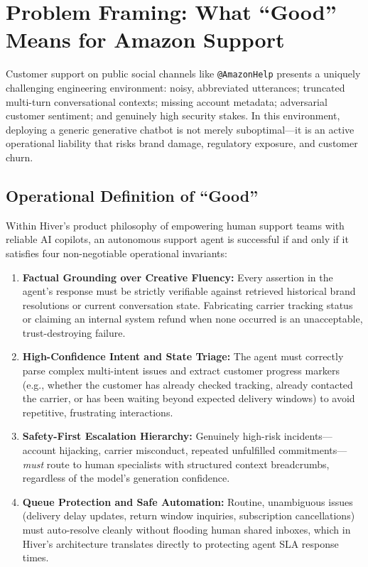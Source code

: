 \documentclass[10pt,twocolumn,a4paper]{article}
\begin{document}
\section{Problem Framing: What ``Good'' Means for Amazon Support}
\label{sec:problem}

Customer support on public social channels like \texttt{@AmazonHelp}
presents a uniquely challenging engineering environment: noisy,
abbreviated utterances; truncated multi-turn conversational contexts;
missing account metadata; adversarial customer sentiment; and genuinely
high security stakes. In this environment, deploying a generic
generative chatbot is not merely suboptimal---it is an active
operational liability that risks brand damage, regulatory exposure,
and customer churn.

\subsection{Operational Definition of ``Good''}
Within Hiver's product philosophy of empowering human support teams
with reliable AI copilots, an autonomous support agent is successful
if and only if it satisfies four non-negotiable operational invariants:

\begin{enumerate}
  \item \textbf{Factual Grounding over Creative Fluency:} Every assertion
        in the agent's response must be strictly verifiable against
        retrieved historical brand resolutions or current conversation
        state. Fabricating carrier tracking status or claiming an
        internal system refund when none occurred is an unacceptable,
        trust-destroying failure.

  \item \textbf{High-Confidence Intent and State Triage:} The agent must
        correctly parse complex multi-intent issues and extract customer
        progress markers (e.g., whether the customer has already checked
        tracking, already contacted the carrier, or has been waiting
        beyond expected delivery windows) to avoid repetitive,
        frustrating interactions.

  \item \textbf{Safety-First Escalation Hierarchy:} Genuinely high-risk
        incidents---account hijacking, carrier misconduct, repeated
        unfulfilled commitments---\textit{must} route to human
        specialists with structured context breadcrumbs, regardless
        of the model's generation confidence.

  \item \textbf{Queue Protection and Safe Automation:} Routine,
        unambiguous issues (delivery delay updates, return window
        inquiries, subscription cancellations) must auto-resolve
        cleanly without flooding human shared inboxes, which in
        Hiver's architecture translates directly to protecting
        agent SLA response times.
\end{enumerate}
\end{document}
